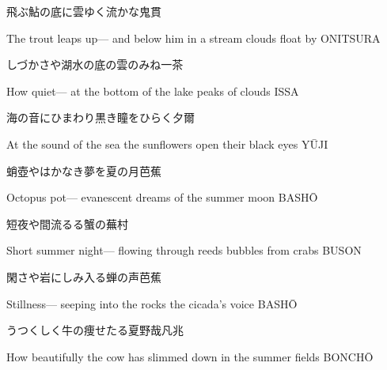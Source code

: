 \begin{haiku}
    {\FH 飛ぶ鮎の底に雲ゆく流かな}\hfill{\FH 鬼貫}

    \vin{} The trout leaps up---
    \vin{} \vin{} and below him in a stream
    \vin{} \vin{} \vin{} clouds float by \hspace{\fill} ONITSURA
\end{haiku}

\begin{haiku}
    {\FH しづかさや湖水の底の雲のみね}\hfill{\FH 一茶}

    \vin{} How quiet---
    \vin{} \vin{} at the bottom of the lake
    \vin{} \vin{} \vin{} peaks of clouds \hspace{\fill} ISSA
\end{haiku}

\begin{haiku}
    {\FH 海の音にひまわり黒き瞳をひらく}\hfill{\FH 夕爾}

    \vin{} At the sound of the sea
    \vin{} \vin{} the sunflowers open
    \vin{} \vin{} \vin{} their black eyes \hspace{\fill} Y\={U}JI
\end{haiku}

\begin{haiku}
    {\FH 蛸壺やはかなき夢を夏の月}\hfill{\FH 芭蕉}

    \vin{} Octopus pot---
    \vin{} \vin{} evanescent dreams
    \vin{} \vin{} \vin{} of the summer moon \hspace{\fill} BASH\={O}
\end{haiku}

\begin{haiku}
    {\FH 短夜や間流るる蟹の}\hfill{\FH 蕪村}

    \vin{} Short summer night---
    \vin{} \vin{} flowing through reeds
    \vin{} \vin{} \vin{} bubbles from crabs \hspace{\fill} BUSON
\end{haiku}

\begin{haiku}
    {\FH 閑さや岩にしみ入る蝉の声}\hfill{\FH 芭蕉}

    \vin{} Stillness---
    \vin{} \vin{} seeping into the rocks
    \vin{} \vin{} \vin{} the cicada's voice \hspace{\fill} BASH\={O}
\end{haiku}

\begin{haiku}
    {\FH うつくしく牛の痩せたる夏野哉}\hfill{\FH 凡兆}

    \vin{} How beautifully
    \vin{} \vin{} the cow has slimmed down
    \vin{} \vin{} \vin{} in the summer fields \hspace{\fill} BONCH\={O}
\end{haiku}

